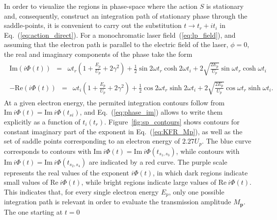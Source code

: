 
In order to visualize the regions in phase-space where the action $S$
is stationary and, consequently, construct an integration path of
stationary phase through the saddle-points, it is convenient to carry
out the substitution $t \to t_{r} + it_{i}$ in
Eq.~(\ref{eq:action_direct}). For a monochromatic laser
field~(\ref{eq:lp_field}), and assuming that the electron path is
parallel to the electric field of the laser, $\phi = 0$, the real and
imaginary components of the phase take the form~\cite{phd_Kopold}
%
\begin{eqnarray}
  \label{eq:phase_im}
  \begin{split}
    \mathrm{Im}(i\Phi(t)) & = & \omega t_{r} ( 1 + \frac{E_{p}}{U_{p}}
    + 2\gamma^{2} ) +
    \frac{1}{2} \sin 2\omega t_{r} \cosh 2\omega t_{i}
    + 2\sqrt{\frac{2E_{p}}{U_{p}}} \sin\omega t_{r} \cosh\omega t_{i}
  \end{split}
\end{eqnarray}
%
\begin{eqnarray}
  \label{eq:phase_re}
  \begin{split}
    -\mathrm{Re}(i\Phi(t)) & = & \omega t_{i} (
    1 + \frac{E_{p}}{U_{p}} + 2\gamma^{2} )
    + \frac{1}{2} \cos 2\omega t_{r} \sinh 2\omega t_{i}
    + 2\sqrt{\frac{2E_{p}}{U_{p}}} \cos\omega t_{r} \sinh\omega t_{i}.
  \end{split}
\end{eqnarray}
%
At a given electron energy, the permited integration contours follow
from $\mathrm{Im}\ i \Phi(t) = \mathrm{Im}\ i \Phi(t_{si})$, and
Eq.~(\ref{eq:phase_im}) allows to write them explicitly as a function
of $t_{i}(t_{r})$. Figure~\ref{fig:sp_contours} shows contours for
constant imaginary part of the exponent in Eq.~(\ref{eq:KFR_Mp}), as
well as the set of saddle points corresponding to an electron energy
of $2.27 U_{p}$. The blue curve corresponds to contours with
$\mathrm{Im}\ i \Phi(t) = \mathrm{Im}\ i \Phi(t_{s_{1},s_{3}})$, while
contours with $\mathrm{Im}\ i \Phi(t) = \mathrm{Im}\ i
\Phi(t_{s_{2},s_{4}})$ are indicated by a red curve. The purple scale
represents the real values of the exponent $i\Phi(t)$, in which dark
regions indicate small values of $\mathrm{Re}\ i\Phi(t)$, while bright
regions indicate large values of $\mathrm{Re}\ i\Phi(t)$. This
indicates that, for every single electron energy $E_{p}$, only one
possible integration path is relevant in order to evaluate the
transmission amplitude $M_{\mathbf{p}}$. The one starting at $t = 0$
